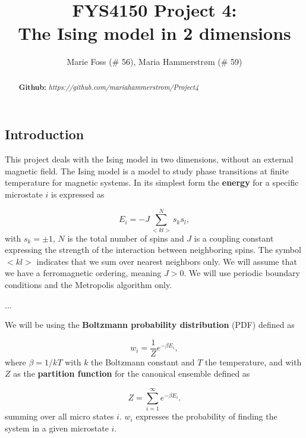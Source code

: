 \documentclass{article}
\title{\textbf{FYS4150 Project 4: \\The Ising model in 2 dimensions}}
\author{Marie Foss (\# 56), Maria Hammerstr{{\o}}m (\# 59)}
\date{} %
\begin{document}
\maketitle

\begin{abstract}
	\noindent \lipsum[1]
	\vspace*{2ex}
	
	\noindent \textbf{Github:} \textit{https://github.com/mariahammerstrom/Project4}
	\vspace*{2ex}
\end{abstract}



\begin{multicols}{2}

\section{Introduction}

This project deals with the Ising model in two dimensions, without an external magnetic field. The Ising model is a model to study phase transitions at finite temperature for magnetic systems. In its simplest form the \textbf{energy} for a specific microstate $i$ is expressed as

\begin{equation}\label{eq:energy}
	E_i = -J \sum_{<kl>}^{N}s_k s_l,
\end{equation}
with  $s_k=\pm 1$, $N$ is the total number of spins and $J$ is a coupling constant expressing the strength of the interaction between neighboring spins. The symbol $<kl>$ indicates that we sum over nearest neighbors only. We will assume that we have a ferromagnetic ordering, meaning $J> 0$. We will use periodic boundary conditions and the Metropolis algorithm only. 

...

We will be using the \textbf{Boltzmann probability distribution} (PDF) defined as

\begin{equation}\label{eq:distribution}
	w_i = \frac{1}{Z} e^{- \beta E_i},
\end{equation}
where $\beta = 1/kT$ with $k$ the Boltzmann constant and $T$ the temperature, and with $Z$ as the \textbf{partition function} for the canonical ensemble defined as

\begin{equation}\label{eq:partition_func}
	Z = \sum_{i = 1}^{\infty} e^{-\beta E_i}.
\end{equation}
summing over all micro states $i$. $w_i$ expresses the probability of finding the system in a given microstate $i$.


\end{multicols}
\end{document}
